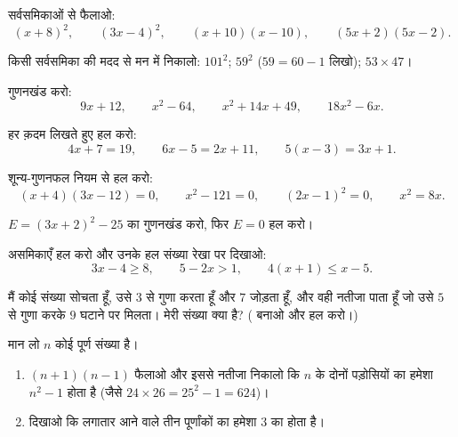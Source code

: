 \begin{exercise}[$\star$]\label{exo:g9:algebra:2}
सर्वसमिकाओं से फैलाओ:
\[
(x + 8)^2, \qquad
(3x - 4)^2, \qquad
(x + 10)(x - 10), \qquad
(5x + 2)(5x - 2).
\]
\end{exercise}

\begin{exercise}[$\star$]\label{exo:g9:algebra:3}
किसी सर्वसमिका की मदद से मन में निकालो: $101^2$; \quad $59^2$
($59 = 60 - 1$ लिखो); \quad $53 \times 47$।
\end{exercise}

\begin{exercise}[$\star$]\label{exo:g9:algebra:4}
गुणनखंड करो:
\[
9x + 12, \qquad
x^2 - 64, \qquad
x^2 + 14x + 49, \qquad
18x^2 - 6x .
\]
\end{exercise}

\begin{exercise}[$\star$]\label{exo:g9:algebra:5}
हर क़दम लिखते हुए हल करो:
\[
4x + 7 = 19, \qquad
6x - 5 = 2x + 11, \qquad
5(x - 3) = 3x + 1 .
\]
\end{exercise}

\begin{exercise}[$\star\star$]\label{exo:g9:algebra:6}
शून्य-गुणनफल नियम से हल करो:
\[
(x + 4)(3x - 12) = 0, \qquad
x^2 - 121 = 0, \qquad
(2x - 1)^2 = 0, \qquad
x^2 = 8x .
\]
\end{exercise}

\begin{exercise}[$\star\star$]\label{exo:g9:algebra:7}
$E = (3x + 2)^2 - 25$ का गुणनखंड करो, फिर $E = 0$ हल करो।
\end{exercise}

\begin{exercise}[$\star\star$]\label{exo:g9:algebra:8}
असमिकाएँ हल करो और उनके हल संख्या रेखा पर दिखाओ:
\[
3x - 4 \geq 8, \qquad
5 - 2x > 1, \qquad
4(x + 1) \leq x - 5 .
\]
\end{exercise}

\begin{exercise}[$\star\star$]\label{exo:g9:algebra:9}
मैं कोई संख्या सोचता हूँ, उसे $3$ से गुणा करता हूँ और $7$ जोड़ता हूँ,
और वही नतीजा पाता हूँ जो उसे $5$ से गुणा करके $9$ घटाने पर मिलता।
मेरी संख्या क्या है? ( बनाओ और हल करो।)
\end{exercise}

\begin{exercise}[$\star\star\star$]\label{exo:g9:algebra:10}
मान लो $n$ कोई पूर्ण संख्या है।
\begin{enumerate}
  \item $(n + 1)(n - 1)$ फैलाओ और इससे नतीजा निकालो कि $n$ के दोनों
        पड़ोसियों का  हमेशा $n^2 - 1$ होता है (जैसे
        $24 \times 26 = 25^2 - 1 = 624$)।
  \item दिखाओ कि लगातार आने वाले तीन पूर्णांकों का  हमेशा $3$
        का  होता है।
\end{enumerate}
\end{exercise}

